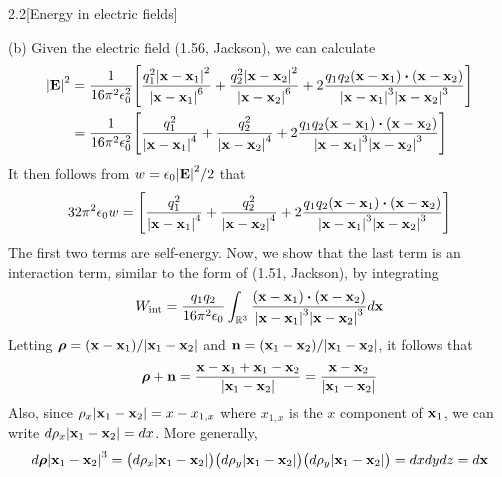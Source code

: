 \documentclass[12pt]{article}
\begin{document}
\begin{problem}{2.2}[Energy in electric fields]
\begin{solution}
(b) Given the electric field (1.56, Jackson), we can calculate
\begin{align}
    \abs{\vb{E}}^2
    &=\frac1{16\pi^2\epsilon_0^2}
        \qty[
            \frac{q_1^2\abs{\vb{x}-\vb{x}_1}^2}{\abs{\vb{x}-\vb{x}_1}^6}
            +\frac{q_2^2\abs{\vb{x}-\vb{x}_2}^2}{\abs{\vb{x}-\vb{x}_2}^6}
            +2\frac{q_1q_2\qty(\vb{x}-\vb{x}_1)\vdot\qty(\vb{x}-\vb{x}_2)}
                {\abs{\vb{x}-\vb{x}_1}^3\abs{\vb{x}-\vb{x}_2}^3}
        ]\notag\\
    &=\frac1{16\pi^2\epsilon_0^2}
        \qty[
            \frac{q_1^2}{\abs{\vb{x}-\vb{x}_1}^4}
            +\frac{q_2^2}{\abs{\vb{x}-\vb{x}_2}^4}
            +2\frac{q_1q_2\qty(\vb{x}-\vb{x}_1)\vdot\qty(\vb{x}-\vb{x}_2)}
                {\abs{\vb{x}-\vb{x}_1}^3\abs{\vb{x}-\vb{x}_2}^3}
        ]
\end{align}
It then follows from $w=\epsilon_0\abs{\vb{E}}^2/2$ that
\begin{equation}
    32\pi^2\epsilon_0w=\qty[
            \frac{q_1^2}{\abs{\vb{x}-\vb{x}_1}^4}
            +\frac{q_2^2}{\abs{\vb{x}-\vb{x}_2}^4}
            +2\frac{q_1q_2\qty(\vb{x}-\vb{x}_1)\vdot\qty(\vb{x}-\vb{x}_2)}
                {\abs{\vb{x}-\vb{x}_1}^3\abs{\vb{x}-\vb{x}_2}^3}
        ]
\end{equation}
The first two terms are self-energy. Now, we show that the last term is an
interaction term, similar to the form of (1.51, Jackson), by integrating
\begin{equation}
    W_{\text{int}}
    =\frac{q_1q_2}{16\pi^2\epsilon_0}\int_{\R^3}
        \frac{\qty(\vb{x}-\vb{x}_1)\vdot\qty(\vb{x}-\vb{x}_2)}
        {\abs{\vb{x}-\vb{x}_1}^3\abs{\vb{x}-\vb{x}_2}^3}d\vb{x}
\end{equation}
Letting $\bm\rho=(\vb{x}-\vb{x}_1)/\abs{\vb{x}_1-\vb{x}_2}$ and
$\vb{n}=(\vb{x}_1-\vb{x}_2)/\abs{\vb{x}_1-\vb{x}_2}$, it follows that
\begin{equation}
    \bm\rho+\vb{n}=\frac{\vb{x}-\vb{x}_1+\vb{x}_1-\vb{x}_2}{\abs{\vb{x}_1-\vb{x}_2}}=\frac{\vb{x}-\vb{x}_2}{\abs{\vb{x}_1-\vb{x}_2}} 
\end{equation}
Also, since $\rho_x\abs{\vb{x}_1-\vb{x}_2}=x-x_{1,x}$ where $x_{1,x}$ is the
$x$ component of $\vb{x}_1$, we can write $d\rho_x\abs{\vb{x}_1-\vb{x}_2}=dx$. 
More generally,
\begin{equation}
    d\bm\rho\abs{\vb{x}_1-\vb{x}_2}^3=
    \qty(d\rho_x\abs{\vb{x}_1-\vb{x}_2})
    \qty(d\rho_y\abs{\vb{x}_1-\vb{x}_2})
    \qty(d\rho_y\abs{\vb{x}_1-\vb{x}_2})
    =dxdydz=d\vb{x}
\end{equation}

\end{solution}
\end{problem}
\end{document}
